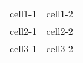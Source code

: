 \label{\detokenize{tabular:table-with-tabularcolumn}}

\begin{savenotes}\sphinxattablestart
\centering
\begin{tabulary}{\linewidth}[t]{|c|c|}
\hline
{}\relax &\relax \\
\hline
cell1-1
&
cell1-2
\\
\hline
cell2-1
&
cell2-2
\\
\hline
cell3-1
&
cell3-2
\\
\hline
\end{tabulary}
\par
\sphinxattableend\end{savenotes}
